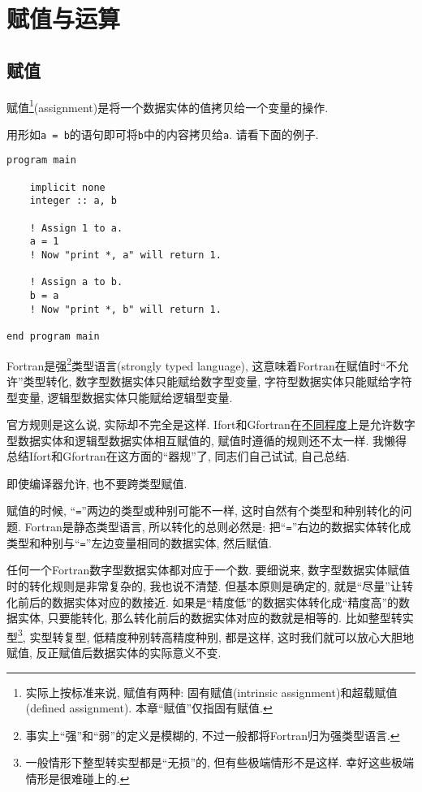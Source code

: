 \chapter{赋值与运算}

\section{赋值}\label{fortran_assignment}

赋值\footnote{
    实际上按标准来说, 赋值有两种: 固有赋值(intrinsic assignment)和超载赋值(defined assignment). 本章``赋值''仅指固有赋值.
}(assignment)是将一个数据实体的值拷贝给一个变量的操作.

用形如\texttt{a = b}的语句即可将\texttt{b}中的内容拷贝给\texttt{a}. 请看下面的例子.
\begin{lstlisting}
program main

    implicit none
    integer :: a, b

    ! Assign 1 to a.
    a = 1
    ! Now "print *, a" will return 1.

    ! Assign a to b.
    b = a
    ! Now "print *, b" will return 1.

end program main
\end{lstlisting}

Fortran是强\footnote{
    事实上``强''和``弱''的定义是模糊的, 不过一般都将Fortran归为强类型语言.
}类型语言(strongly typed language), 这意味着Fortran在赋值时``不允许''类型转化, 数字型数据实体只能赋给数字型变量, 字符型数据实体只能赋给字符型变量, 逻辑型数据实体只能赋给逻辑型变量.

官方规则是这么说, 实际却不完全是这样. Ifort和Gfortran在\uline{不同程度}上是允许数字型数据实体和逻辑型数据实体相互赋值的, 赋值时遵循的规则还不太一样. 我懒得总结Ifort和Gfortran在这方面的``器规''了, 同志们自己试试, 自己总结.

\begin{convention}
    即使编译器允许, 也不要跨类型赋值.
\end{convention}

赋值的时候, ``\texttt{=}''两边的类型或种别可能不一样, 这时自然有个类型和种别转化的问题. Fortran是静态类型语言, 所以转化的总则必然是: 把``\texttt{=}''右边的数据实体转化成类型和种别与``\texttt{=}''左边变量相同的数据实体, 然后赋值.

任何一个Fortran数字型数据实体都对应于一个数. 要细说来, 数字型数据实体赋值时的转化规则是非常复杂的, 我也说不清楚. 但基本原则是确定的, 就是``尽量''让转化前后的数据实体对应的数接近. 如果是``精度低''的数据实体转化成``精度高''的数据实体, 只要能转化, 那么转化前后的数据实体对应的数就是相等的. 比如整型转实型\footnote{
    一般情形下整型转实型都是``无损''的, 但有些极端情形不是这样. 幸好这些极端情形是很难碰上的.
}, 实型转复型, 低精度种别转高精度种别, 都是这样, 这时我们就可以放心大胆地赋值, 反正赋值后数据实体的实际意义不变.

